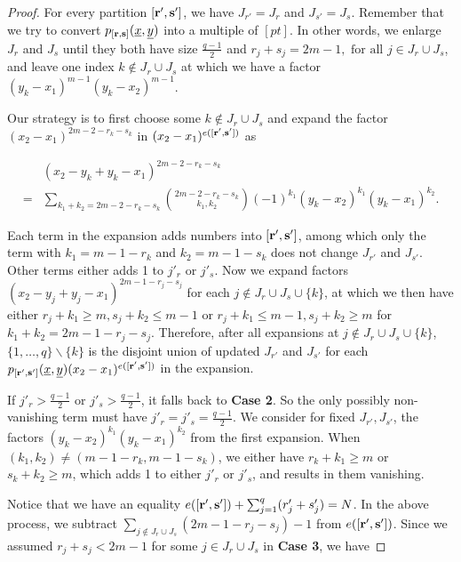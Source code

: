 \documentclass[11pt]{article}
\begin{document}
\begin{proof}
    For every partition \([\mathbf{r'}, \mathbf{s'}]\), we have \(J_{r'} = J_r\) and \(J_{s'} = J_s\). Remember that we try to convert \(p_{[\mathbf{r}, \mathbf{s}]}(\underline{x}, \underline{y})\) into a multiple of \([pt]\). In other words, we enlarge \(J_r\) and \(J_s\) until they both have size \(\frac{q-1}{2}\) and \(r_j + s_j = 2m-1, \text{ for all } j\in J_r\cup J_s\), and leave one index \(k\notin J_r\cup J_s\) at which we have a factor \((y_k - x_1)^{m-1}(y_k - x_2)^{m-1}\). 

    Our strategy is to first choose some \(k\notin J_r\cup J_s\) and expand the factor \((x_2 - x_1)^{2m-2-r_k-s_k}\) in \((x_2-x_1)^{e([\mathbf{r'}, \mathbf{s'}])}\) as
    
    \begin{align*}
        &(x_2 - y_k + y_k - x_1)^{2m-2-r_k-s_k} \\ 
        =& \sum_{k_1+k_2=2m-2-r_k-s_k}\binom{2m-2-r_k-s_k}{k_1, k_2}(-1)^{k_1}(y_k - x_2)^{k_1}(y_k - x_1)^{k_2}.
    \end{align*}

    Each term in the expansion adds numbers into \([\mathbf{r'}, \mathbf{s'}]\), among which only the term with \(k_1 = m-1-r_k\) and \(k_2 = m-1-s_k\) does not change \(J_{r'}\) and \(J_{s'}\). Other terms either adds 1 to \(j'_r\) or \(j'_s\). Now we expand factors \((x_2 - y_j + y_j - x_1)^{2m-1-r_j-s_j}\) for each \(j\notin J_r\cup J_s\cup \{k\}\), at which we then have either \(r_j+k_1\geq m, s_j+k_2\leq m-1\) or \(r_j+k_1\leq m-1, s_j+k_2\geq m\) for \(k_1 + k_2 = 2m-1-r_j-s_j\). Therefore, after all expansions at \(j\notin J_r\cup J_s\cup\{k\}\), \(\{1, \dots, q\}\backslash\{k\}\) is the disjoint union of updated \(J_{r'}\) and \(J_{s'}\) for each \(p_{[\mathbf{r}', \mathbf{s}']}(\underline{x}, \underline{y})(x_2 - x_1)^{e([\mathbf{r'}, \mathbf{s'}])}\) in the expansion. 

    If \(j'_r > \frac{q-1}{2}\) or \(j'_s > \frac{q-1}{2}\), it falls back to \textbf{Case 2}. So the only possibly non-vanishing term must have \(j'_r = j'_s = \frac{q-1}{2}\). We consider for fixed \(J_{r'}, J_{s'}\), the factors \((y_k - x_2)^{k_1}(y_k - x_1)^{k_2}\) from the first expansion. When \((k_1, k_2) \neq (m-1-r_k, m-1-s_k)\), we either have \(r_k+k_1\geq m\) or \(s_k+k_2\geq m\), which adds 1 to either \(j'_r\) or \(j'_s\), and results in them vanishing. 

    Notice that we have an equality \(e([\mathbf{r'}, \mathbf{s'}]) + \sum_{j=1}^q (r'_j + s'_j) = N\). In the above process, we subtract \(\sum_{j\notin J_r\cup J_s}(2m-1-r_j-s_j)-1\) from \(e([\mathbf{r'}, \mathbf{s'}])\). Since we assumed \(r_j + s_j < 2m-1\) for some \(j\in J_r\cup J_s\) in \textbf{Case 3}, we have 


\end{proof}
\end{document}

